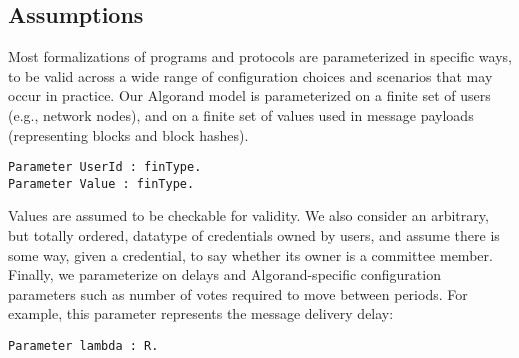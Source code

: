 \subsection{Assumptions}

Most formalizations of programs and protocols are parameterized in specific ways, to be valid across a wide range of configuration choices and scenarios that may occur in practice. Our Algorand model is parameterized on a finite set of users (e.g., network nodes), and on a finite set of values used in message payloads (representing blocks and block hashes). 

\begin{lstlisting}[language=Coq]
Parameter UserId : finType.
Parameter Value : finType.
\end{lstlisting}

Values are assumed to be checkable for validity. We also consider an arbitrary, but totally ordered, datatype of credentials owned by users, and assume there is some way, given a credential, to say whether its owner is a committee member. Finally, we parameterize on delays and Algorand-specific configuration parameters such as number of votes required to move between periods. For example, this parameter represents the message delivery delay:

\begin{lstlisting}[language=Coq]
Parameter lambda : R.
\end{lstlisting}

